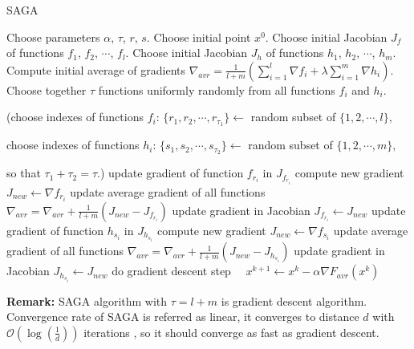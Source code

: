 \documentclass[11pt]{book}
\theoremstyle{definition}
\begin{document}
	\begin{algorithm}[H]
		\caption{SAGA \cite{SAGA}}
		\label{alg:saga}
		\begin{algorithmic}[1]
			\State Choose parameters $\alpha$, $\tau$, $r$, $s$.
			\State Choose initial point $x^0$.
			\State Choose initial Jacobian $J_f$ of functions $f_1$, $f_2$, $\cdots$, $f_l$.
			\State Choose initial Jacobian $J_h$ of functions $h_1$, $h_2$, $\cdots$, $h_m$.
			\State Compute initial average of gradients $\nabla_{avr} = \frac{1}{l+m} \left( \sum_{i=1}^l \nabla f_i + \lambda\sum_{i=1}^m \nabla h_i \right)$.
			\State Choose together $\tau$ functions uniformly randomly from all functions $f_i$ and $h_i$.
			
			(choose indexes of functions $f_i$: $\{r_1, r_2, \cdots, r_{\tau_1} \} \leftarrow$ random subset of $\{1,2,\cdots, l \},$
			
			choose indexes of functions $h_i$: $\{s_1, s_2, \cdots, s_{\tau_2} \} \leftarrow$ random subset of $\{1,2,\cdots, m \},$
			
			so that $\tau_1 + \tau_2=\tau.$)
			 update gradient of function $f_{r_i}$ in $J_{f_{r_i}}$
			\State compute new gradient $J_{new} \leftarrow \nabla f_{r_i}$
			\State update average gradient of all functions $\nabla_{avr}=\nabla_{avr}+\frac{1}{l+m}(J_{new}-J_{f_{r_i}})$
			\State update gradient in Jacobian
			$J_{f_{r_i}} \leftarrow J_{new}$
			\EndFor
			 update gradient of function $h_{s_i}$ in $J_{h_{s_i}}$
			\State compute new gradient $J_{new} \leftarrow \nabla f_{s_i}$
			\State update average gradient of all functions $\nabla_{avr}=\nabla_{avr}+\frac{1}{l+m}(J_{new}-J_{h_{s_i}})$
			\State update gradient in Jacobian
			$J_{h_{s_i}} \leftarrow J_{new}$
			\EndFor
			\State do gradient descent step $\quad x^{k+1} \leftarrow x^k - \alpha\nabla F_{avr}(x^k) \quad$
			\EndFor
		\end{algorithmic}
	\end{algorithm}
	
	\textbf{Remark:} SAGA algorithm with $\tau=l+m$ is gradient descent algorithm.\\
	
	Convergence rate of SAGA is referred as linear, it converges to distance $d$ with $\mathcal{O}(\log(\frac{1}{d}))$ iterations \cite{SAGA}, so it should converge as fast as gradient descent.\\
	
\end{document}
